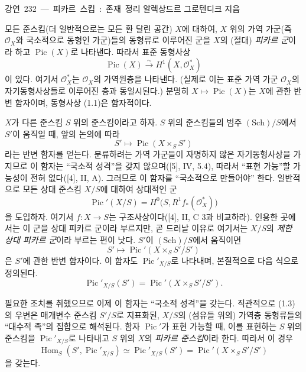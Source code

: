 \unit{강연 232 — 피카르 스킴: 존재 정리}
%
  {알렉상드르 그로텐디크 지음}


모든 준스킴(더 일반적으로는 모든 환 달린 공간) $X$에 대하여, $X$ 위의
가역 가군(즉 $\mathcal O_X$와 국소적으로 동형인 가군)들의 동형류로
이루어진 군을 $X$의 (절대) \emph{피카르 군}이라 하고
$\operatorname{Pic}(X)$로 나타낸다. 따라서 표준 동형사상
\begin{equation}
\operatorname{Pic}(X)\xrightarrow{\sim}H^1(X,\mathcal O_X^*)
\tag{1.1}
\end{equation}
이 있다. 여기서 $\mathcal O_X^*$는 $\mathcal O_X$의 가역원층을 나타낸다.
(실제로 이는 표준 가역 가군 $\mathcal O_X$의 자기동형사상들로 이루어진
층과 동일시된다.) 분명히 $X\longmapsto\operatorname{Pic}(X)$는 $X$에 관한
반변 함자이며, 동형사상 (1.1)은 함자적이다.

$X$가 다른 준스킴 $S$ 위의 준스킴이라고 하자. $S$ 위의 준스킴들의 범주
$(\mathrm{Sch})/S$에서 $S'$이 움직일 때, 앞의 논의에 따라
\[
S'\longmapsto\operatorname{Pic}(X\times_S S')
\]
라는 반변 함자를 얻는다. 분류하려는 가역 가군들이 자명하지 않은
자기동형사상을 가지므로 이 함자는 “국소적 성격”을 갖지 않으며([5], IV,
5.4), 따라서 “표현 가능”할 가능성이 전혀 없다([4], II, A). 그러므로 이
함자를 “국소적으로 만들어야” 한다. 일반적으로 모든 상대 준스킴 $X/S$에
대하여 상대적인 군
\begin{equation}
\operatorname{Pic}'(X/S)=H^0\bigl(S,R^1f_*(\mathcal O_X^*)\bigr)
\tag{1.2}
\end{equation}
을 도입하자. 여기서 $f:X\longrightarrow S$는 구조사상이다([4], II, C 3과
비교하라). 인용한 곳에서는 이 군을 상대 피카르 군이라 부르지만, 곧
드러날 이유로 여기서는 $X/S$의 \emph{제한 상대 피카르 군}이라 부르는
편이 낫다. $S'$이 $(\mathrm{Sch})/S$에서 움직이면
\[
S'\longmapsto\operatorname{Pic}'(X\times_S S'/S')
\]
은 $S'$에 관한 반변 함자이다. 이 함자도
$\operatorname{Pic}'_{X/S}$로 나타내며, 본질적으로 다음 식으로 정의된다.
\begin{equation}
\operatorname{Pic}'_{X/S}(S')=
\operatorname{Pic}'(X\times_S S'/S').
\tag{1.3}
\end{equation}

필요한 조치를 취했으므로 이제 이 함자는 “국소적 성격”을 갖는다.
직관적으로 (1.3)의 우변은 매개변수 준스킴 $S'/S$로 지표화된, $X/S$의
(섬유들 위의) 가역층 동형류들의 “대수적 족”의 집합으로 해석된다. 함자
$\operatorname{Pic}'$가 표현 가능할 때, 이를 표현하는 $S$ 위의 준스킴을
$\operatorname{Pic}'_{X/S}$로 나타내고 $S$ 위의 $X$의
\emph{피카르 준스킴}이라 한다. 따라서 이 경우
\begin{equation}
\operatorname{Hom}_S(S',\operatorname{Pic}'_{X/S})
\simeq\operatorname{Pic}'_{X/S}(S')
=\operatorname{Pic}'(X\times_S S'/S')
\tag{1.4}
\end{equation}
을 갖는다.

